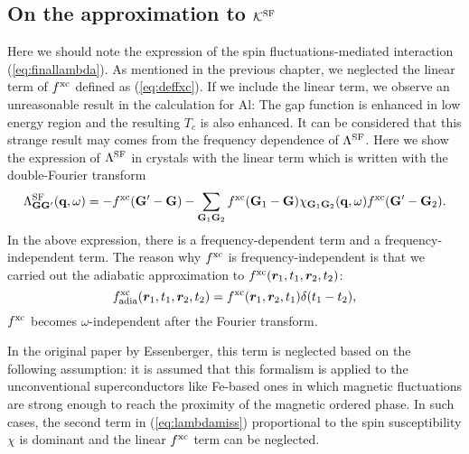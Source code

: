 \subsection{On the approximation to $\mathcal K^{\rm SF}$}
Here we should note the expression of the spin fluctuations-mediated interaction (\ref{eq:finallambda}).
As mentioned in the previous chapter, we neglected the linear term of $f^{\rm xc}$ defined as 
(\ref{eq:deffxc}). If we include the linear term, we observe an unreasonable result in the
calculation for Al: The gap function is enhanced in low energy region and the resulting $T_c$
is also enhanced. It can be considered that this strange result may comes from the frequency
dependence of $\Lambda^{\rm SF}$. Here we show the expression of $\Lambda^{\rm SF}$ in crystals with 
the linear term which is written with the double-Fourier transform\cite{Hybertsen1987}
%
\begin{equation}
	\Lambda^{\rm SF}_{\mathbf G \mathbf G'}(\mathbf q, \omega) = -f^{\rm xc}(\mathbf G' - \mathbf G) - 
	\sum_{\mathbf G_1 \mathbf G_2} f^{\rm xc}(\mathbf G_1 - \mathbf G)\chi_{\mathbf G_1 \mathbf G_2}(\mathbf q, \omega)
	f^{\rm xc}(\mathbf G' - \mathbf G_2).
	\label{eq:lambdamiss}
\end{equation}
%
In the above expression, there is a frequency-dependent term and a frequency-independent term.
The reason why $f^{\rm xc}$ is frequency-independent is that we carried out 
the adiabatic approximation to $f^{\rm xc}(\bm r_1,t_1, \bm r_2,t_2)$:
%
\begin{equation}
	f^{\rm xc}_{\rm adia}(\bm r_1,t_1, \bm r_2, t_2) = f^{\rm xc}(\bm r_1,\bm r_2, t_1)\delta(t_1 - t_2),
	\label{eq:adiabatic}
\end{equation}
%
$f^{\rm xc}$ becomes $\omega$-independent after the Fourier transform.

In the original paper by Essenberger\cite{Essenberger2014}, this term is neglected based on the following assumption:
it is assumed that this formalism is applied to the unconventional superconductors like Fe-based ones
in which magnetic fluctuations are strong enough to reach the proximity of the magnetic ordered phase.
In such cases, the second term in (\ref{eq:lambdamiss}) proportional to the spin 
susceptibility $\chi$ is dominant and the linear $f^{\rm xc}$ term can be neglected.

